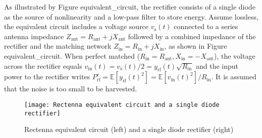 As illustrated by Figure {equivalent_circuit}, the rectifier consists of a single diode as the source of nonlinearity and a low-pass filter to store energy. Assume lossless, the equivalent circuit includes a voltage source ${v_{\text{s}}}(t)$ connected to a series antenna impedance ${Z_{{\text{ant}}}} = {R_{{\text{ant}}}} + j{X_{{\text{ant}}}}$ followed by a combined impedance of the rectifier and the matching network ${Z_{{\text{in}}}} = {R_{{\text{in}}}} + j{X_{{\text{in}}}}$, as shown in Figure {equivalent_circuit}. When perfect matched (${R_{{\text{in}}}} = {R_{{\text{ant}}}},{X_{{\text{in}}}} =  - {X_{{\text{ant}}}}$), the voltage across the rectifier equals ${v_{{\text{in}}}}(t) = {v_{\text{s}}}(t)/2 = {y_{{\text{rf}}}}(t)\sqrt {{R_{{\text{in}}}}} $ and the input power to the rectifier writes $P_{{\text{rf}}}^r = \mathbb{E}\left[ {{y_{{\text{rf}}}}{{(t)}^2}} \right] = \mathbb{E}\left[ {{v_{{\text{in}}}}{{(t)}^2}} \right]/{R_{{\text{in}}}}$. It is assumed that the noise is too small to be harvested.

\begin{figure}
  \centering
    \texttt{[image: Rectenna equivalent circuit and a single diode rectifier]}
  \caption{Rectenna equivalent circuit (left) and a single diode rectifier (right) \cite{Clerckx2018a}}
  \label{fig:rectenna_circuit}
\end{figure}